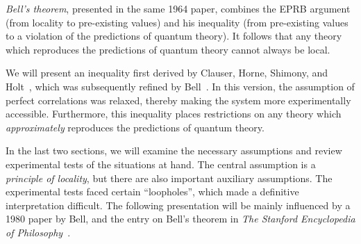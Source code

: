 \emph{Bell's theorem}, presented in the same 1964 paper, combines the EPRB argument (from locality to pre-existing values) and his inequality (from pre-existing values to a violation of the predictions of quantum theory).
It follows that any theory which reproduces the predictions of quantum theory cannot always be local.

We will present an inequality first derived by Clauser, Horne, Shimony, and Holt~\cite{Clauser:1969ny}, which was subsequently refined by Bell~\cite{Bell:1971}.
In this version, the assumption of perfect correlations was relaxed, thereby making the system more experimentally accessible.
Furthermore, this inequality places restrictions on any theory which \emph{approximately} reproduces the predictions of quantum theory.

In the last two sections, we will examine the necessary assumptions and review experimental tests of the situations at hand.
The central assumption is a \emph{principle of locality}, but there are also important auxiliary assumptions.
The experimental tests faced certain \enquote{loopholes}, which made a definitive interpretation difficult.
The following presentation will be mainly influenced by a 1980 paper by Bell, and the entry on Bell's theorem in \emph{The Stanford Encyclopedia of Philosophy}~\cite{Bell:1980wg,sep-bell-theorem}.